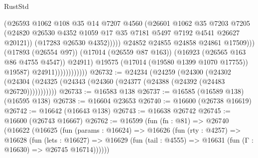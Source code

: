 \begin{lexlean}{RustStd}
\begin{coremodule}
{\begin{coremodule}
{{{{{{{{{{{{{{{{{{{{{{{{{{{{{{{{{{{{{{{{{{{{{{{{{{{{{{{                                            (@26593
                                              @1062
                                              @108
                                              @35
                                              @14
                                              @7207
                                              @4560
                                              (@26601
                                                @1062
                                                @35
                                                @7203
                                                @7205
                                                (@24820
                                                  @26530
                                                  @4352
                                                  @1059
                                                  @17
                                                  @35
                                                  @7181
                                                  @5497
                                                  @7192
                                                  @4541
                                                  @26627
                                                  @20121))
                                              (@17283 @26530 @4352)))))
                                      @24852
                                      @24855
                                      @24858
                                      @24861
                                      @17509)))
                                (@17893 (@26554 @97))
                                (@17014 (@26559 @87 @163))
                                (@16923 (@26565 @163 @86 @4755 @4547))
                                @24911)
                              @19575
                              (@17014 (@19580 @1399 @1070 @17755))
                              @19587)
                            @24911))))))))))))
@26732 := @24234
    (@24259
      (@24300
        (@24302 (@24304 (@24325 (@24343 (@24360 (@24377 (@24388 (@24392 (@24483 @26720)))))))))))
@26733 := @16583 @138
@26737 := @16585 (@16589 @138) (@16595 @138)
@26738 := @16604 @23653
@26740 := @16600 (@26738 @16619)
@26742 := @16642 (@16643 @138)
@26743 := @16638 @26742
@26745 := @16600 (@26743 @16667)
@26762 := @16599
    (fun (fn : @81) =>
    @26740
      (@16622
        (@16625
          (fun (params : @16624) =>
          @16626
            (fun (rty : @4257) =>
            @16628
              (fun (lets : @16627) =>
              @16629 (fun (tail : @4555) => @16631 (fun (Γ : @16630) => @26745 @16714))))))
}}}}}}}}}}}}}}}}}}}}}}}}}}}}}}}}}}}}}}}}}}}}}}}}}}}}}}}
\end{coremodule}}
\end{coremodule}
\end{lexlean}
